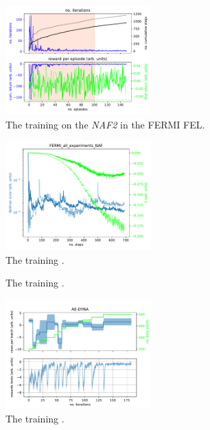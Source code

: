 \documentclass[
 reprint,
 amsmath,amssymb,amsfonts,clevref,
 aps,
prstab,
]{revtex4-2}
\begin{document}
\begin{figure}[!h]
	\centering
	\includegraphics*[width=0.5\textwidth]{Figures/FERMI_all_experiments_NAF_episodes.pdf}
	\caption{The training on the \emph{NAF2} in the FERMI FEL.}
	\label{fig:NAF_training}
\end{figure}
\begin{figure}[!h]
	\centering
	\includegraphics*[width=0.5\textwidth]{Figures/FERMI_all_experiments_NAF_convergence.pdf}
	\caption{The training .}
	\label{fig:NAF_convergence}
\end{figure}

\begin{figure}[!h]
	\centering
	
	\caption{The training .}
	\label{fig:comparsion_per}
\end{figure}




\begin{figure}[!h]
	\centering
	\includegraphics*[width=0.5\textwidth]{Figures/AE-DYNA_observables.pdf}
	\caption{The training .}
	\label{fig:AE-DYNA_observables}
\end{figure}
\end{document}

